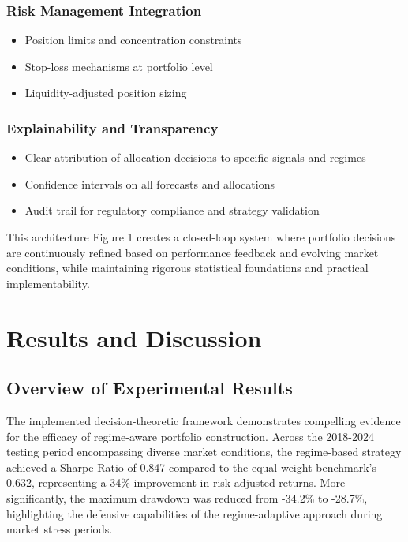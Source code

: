 \documentclass{singlecol-new}
\theoremstyle{TH}{
\newtheorem{lemma}{Lemma}
\newtheorem{theorem}[lemma]{Theorem}
\newtheorem{corrolary}[lemma]{Corrolary}
\newtheorem{conjecture}[lemma]{Conjecture}
\newtheorem{proposition}[lemma]{Proposition}
\newtheorem{claim}[lemma]{Claim}
\newtheorem{stheorem}[lemma]{Wrong Theorem}
\newtheorem{algorithm}{Algorithm}
}
\theoremstyle{THrm}{
\newtheorem{definition}{Definition}[section]
\newtheorem{question}{Question}[section]
\newtheorem{remark}{Remark}
\newtheorem{scheme}{Scheme}
}
\theoremstyle{THhit}{
\newtheorem{case}{Case}[section]
}
\begin{document}
\subsubsection{Risk Management Integration}
\begin{itemize}
    \item Position limits and concentration constraints
    \item Stop-loss mechanisms at portfolio level
    \item Liquidity-adjusted position sizing
\end{itemize}

\subsubsection{Explainability and Transparency}
\begin{itemize}
    \item Clear attribution of allocation decisions to specific signals and regimes
    \item Confidence intervals on all forecasts and allocations
    \item Audit trail for regulatory compliance and strategy validation
\end{itemize}

This architecture Figure 1 creates a closed-loop system where portfolio decisions are continuously refined based on performance feedback and evolving market conditions, while maintaining rigorous statistical foundations and practical implementability.





\section{Results and Discussion} 


\subsection{Overview of Experimental Results}
The implemented decision-theoretic framework demonstrates compelling evidence for the efficacy of regime-aware portfolio construction. Across the 2018-2024 testing period encompassing diverse market conditions, the regime-based strategy achieved a Sharpe Ratio of 0.847 compared to the equal-weight benchmark's 0.632, representing a 34\% improvement in risk-adjusted returns. More significantly, the maximum drawdown was reduced from -34.2\% to -28.7\%, highlighting the defensive capabilities of the regime-adaptive approach during market stress periods.
\end{document}
